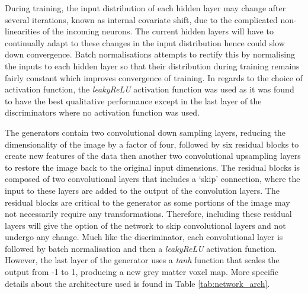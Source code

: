 During training, the input distribution of each hidden layer may change after several iterations, known as internal covariate shift, due to the complicated non-linearities of the incoming neurons. The current hidden layers will have to continually adapt to these changes in the input distribution hence could slow down convergence. Batch normalisations attempts to rectify this by normalising the inputs to each hidden layer so that their distribution during training remains fairly constant \citep{DBLP:journals/corr/IoffeS15} which improves convergence of training. In regards to the choice of activation function, the \textit{leakyReLU} activation function was used as it was found to have the best qualitative performance except in the last layer of the discriminators where no activation function was used.

The generators contain two convolutional down sampling layers, reducing the dimensionality of the image by a factor of four, followed by six residual blocks to create new features of the data then another two convolutional upsampling layers to restore the image back to the original input dimensions. The residual blocks is composed of two convolutional layers that includes a `skip' connection, where the input to these layers are added to the output of the convolution layers. The residual blocks are critical to the generator as some portions of the image may not necessarily require any transformations. Therefore, including these residual layers will give the option of the network to skip convolutional layers and not undergo any change. Much like the discriminator, each convolutional layer is followed by batch normalisation and then a \textit{leakyReLU} activation function. However, the last layer of the generator uses a \textit{tanh} function that scales the output from -1 to 1, producing a new grey matter voxel map. More specific details about the architecture used is found in Table \ref{tab:network_arch}.

